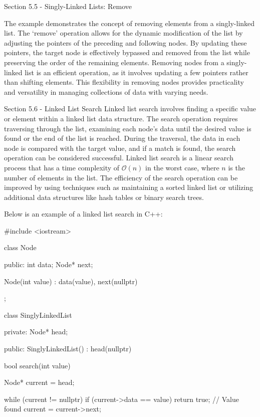 \begin{notes}{Section 5.5 - Singly-Linked Lists: Remove}
\begin{highlight}
        The example demonstrates the concept of removing elements from a singly-linked list. The `remove' operation allows for the dynamic modification of the list by adjusting the pointers of the preceding and following nodes. By updating these pointers, the target node is 
        effectively bypassed and removed from the list while preserving the order of the remaining elements. Removing nodes from a singly-linked list is an efficient operation, as it involves updating a few pointers rather than shifting elements. This flexibility in removing nodes 
        provides practicality and versatility in managing collections of data with varying needs.
    \end{highlight}
\end{notes}

\begin{notes}{Section 5.6 - Linked List Search}
    Linked list search involves finding a specific value or element within a linked list data structure. The search operation requires traversing through the list, examining each node's data until the desired value is found or the end of the list is reached. During the traversal, 
    the data in each node is compared with the target value, and if a match is found, the search operation can be considered successful. Linked list search is a linear search process that has a time complexity of $\mathcal{O}(n)$ in the worst case, where $n$ is the number of elements in the list. 
    The efficiency of the search operation can be improved by using techniques such as maintaining a sorted linked list or utilizing additional data structures like hash tables or binary search trees.
    
    \begin{highlight}
        Below is an example of a linked list search in C++:
        
    \begin{code}[C++]
    #include <iostream>

    class Node {
    public:
        int data;
        Node* next;
    
        Node(int value) : data(value), next(nullptr) {}
    };
    
    class SinglyLinkedList {
    private:
        Node* head;
    
    public:
        SinglyLinkedList() : head(nullptr) {}
    
        bool search(int value) {
            Node* current = head;
    
            while (current != nullptr) {
                if (current->data == value) {
                    return true;  // Value found
                }
                current = current->next;
            }
    
}}
\end{code}
\end{highlight}
\end{notes}
